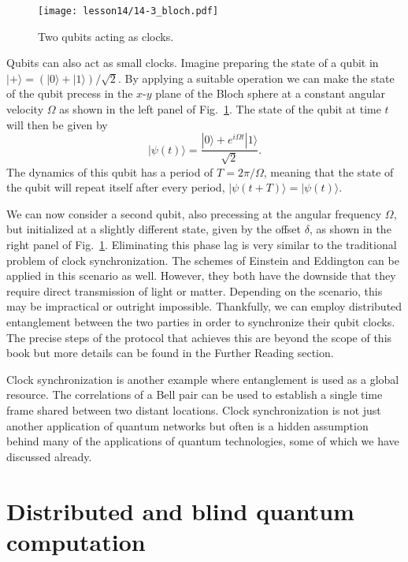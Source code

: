\begin{figure}[t]
    \centering
    \texttt{[image: lesson14/14-3\_bloch.pdf]}
    \caption[Qubit clocks.]{Two qubits acting as clocks.}
    \label{fig:14-3_bloch}
\end{figure}

Qubits can also act as small clocks.
Imagine preparing the state of a qubit in $|+\rangle = (|0\rangle + |1\rangle) / \sqrt{2}$.
By applying a suitable operation we can make the state of the qubit precess in the $x$-$y$ plane of the Bloch sphere at a constant angular velocity $\Omega$ as shown in the left panel of Fig.~\ref{fig:14-3_bloch}.
The state of the qubit at time $t$ will then be given by
\begin{equation}
    |\psi(t)\rangle = \frac{|0\rangle + e^{i\Omega t} |1\rangle}{\sqrt{2}}.
\end{equation}
The dynamics of this qubit has a period of $T = 2\pi / \Omega$, meaning that the state of the qubit will repeat itself after every period, $|\psi(t+T)\rangle = |\psi(t)\rangle$.

We can now consider a second qubit, also precessing at the angular frequency $\Omega$, but initialized at a slightly different state, given by the offset $\delta$, as shown in the right panel of Fig.~\ref{fig:14-3_bloch}.
Eliminating this phase lag is very similar to the traditional problem of clock synchronization.
The schemes of Einstein and Eddington can be applied in this scenario as well.
However, they both have the downside that they require direct transmission of light or matter.
Depending on the scenario, this may be impractical or outright impossible.
Thankfully, we can employ distributed entanglement between the two parties in order to synchronize their qubit clocks.
The precise steps of the protocol that achieves this are beyond the scope of this book but more details can be found in the Further Reading section.

Clock synchronization is another example where entanglement is used as a global resource.
The correlations of a Bell pair can be used to establish a single time frame shared between two distant locations.
Clock synchronization is not just another application of quantum networks but often is a hidden assumption behind many of the applications of quantum technologies, some of which we have discussed already.






\section{Distributed and blind quantum computation}
\label{sec:14-4_distributed_bqc}

